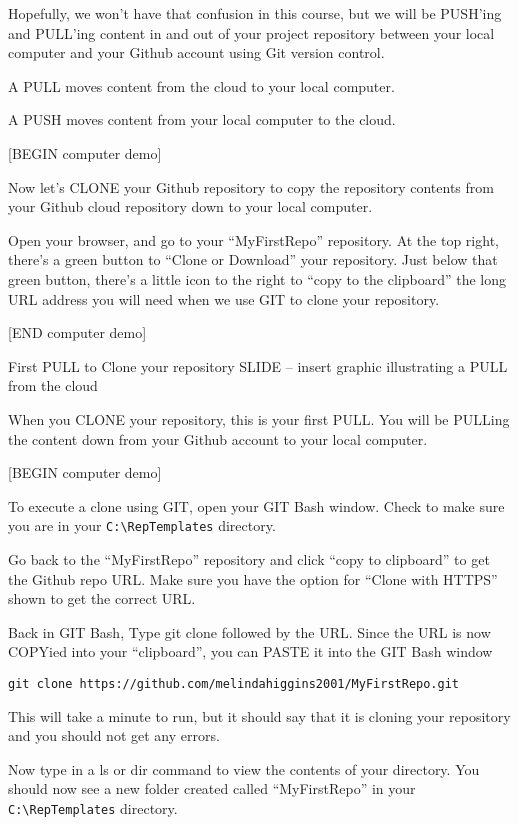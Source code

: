 \documentclass[]{book}
\theoremstyle{definition}
\theoremstyle{definition}
\theoremstyle{definition}
\theoremstyle{remark}
\begin{document}
Hopefully, we won't have that confusion in this course, but we will be
PUSH'ing and PULL'ing content in and out of your project repository
between your local computer and your Github account using Git version
control.

A PULL moves content from the cloud to your local computer.

A PUSH moves content from your local computer to the cloud.

{[}BEGIN computer demo{]}

Now let's CLONE your Github repository to copy the repository contents
from your Github cloud repository down to your local computer.

Open your browser, and go to your ``MyFirstRepo'' repository. At the top
right, there's a green button to ``Clone or Download'' your repository.
Just below that green button, there's a little icon to the right to
``copy to the clipboard'' the long URL address you will need when we use
GIT to clone your repository.

{[}END computer demo{]}

First PULL to Clone your repository SLIDE -- insert graphic illustrating
a PULL from the cloud

When you CLONE your repository, this is your first PULL. You will be
PULLing the content down from your Github account to your local
computer.

{[}BEGIN computer demo{]}

To execute a clone using GIT, open your GIT Bash window. Check to make
sure you are in your \texttt{C:\textbackslash{}RepTemplates} directory.

Go back to the ``MyFirstRepo'' repository and click ``copy to
clipboard'' to get the Github repo URL. Make sure you have the option
for ``Clone with HTTPS'' shown to get the correct URL.

Back in GIT Bash, Type git clone followed by the URL. Since the URL is
now COPYied into your ``clipboard'', you can PASTE it into the GIT Bash
window

\texttt{git\ clone\ https://github.com/melindahiggins2001/MyFirstRepo.git}

This will take a minute to run, but it should say that it is cloning
your repository and you should not get any errors.

Now type in a ls or dir command to view the contents of your directory.
You should now see a new folder created called ``MyFirstRepo'' in your
\texttt{C:\textbackslash{}RepTemplates} directory.
\end{document}
